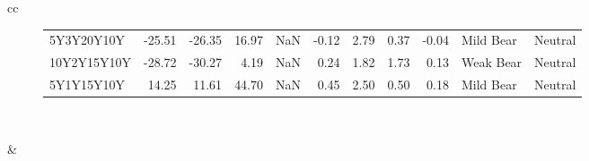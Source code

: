 \documentclass[a4paper,twoside]{report}
\begin{document}
\begin{figure}[htbp]
\begin{tabular}[c]{cc}
\begin{subfigure}[c]{0.5\textwidth}
\begin{adjustbox}{max width=\textwidth}
\begin{tabular}{lrrrrrrrrll}
   5Y3Y20Y10Y &  -25.51 &   -26.35 &     16.97 &    NaN & -0.12 &      2.79 &   0.37 &    -0.04 &    Mild Bear &           Neutral \\
  10Y2Y15Y10Y &  -28.72 &   -30.27 &      4.19 &    NaN &  0.24 &      1.82 &   1.73 &     0.13 &    Weak Bear &           Neutral \\
   5Y1Y15Y10Y &   14.25 &    11.61 &     44.70 &    NaN &  0.45 &      2.50 &   0.50 &     0.18 &    Mild Bear &           Neutral \\
\hline
\end{tabular}
\end{adjustbox}
\end{subfigure}\\
 
 

\begin{subfigure}[c]{0.5\textwidth}
 
 \null\hfill
 \end{subfigure}&
 

\end{tabular}
\end{figure}
\end{document}
